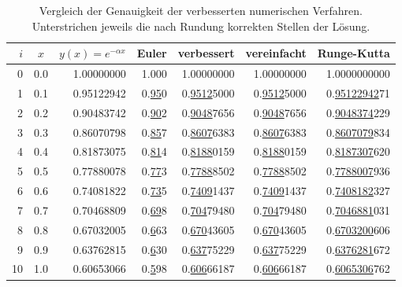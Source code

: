 \begin{table}
\centering
\begin{tabular}{|r|c|r|r|r|r|r|}
\hline
$i$& $x$ & $y(x)=e^{-\alpha x}$&Euler&verbessert&vereinfacht&Runge-Kutta\\
\hline
 0 & 0.0 & 1.00000000 & 1.000 & 1.00000000 & 1.00000000 & 1.0000000000 \\
 1 & 0.1 & 0.95122942 & 0.\underline{95}0 & 0.\underline{9512}5000 & 0.\underline{9512}5000 & 0.\underline{95122942}71 \\
 2 & 0.2 & 0.90483742 & 0.\underline{90}2 & 0.\underline{9048}7656 & 0.\underline{9048}7656 & 0.\underline{9048374}229 \\
 3 & 0.3 & 0.86070798 & 0.\underline{85}7 & 0.\underline{8607}6383 & 0.\underline{8607}6383 & 0.\underline{8607079}834 \\
 4 & 0.4 & 0.81873075 & 0.\underline{81}4 & 0.\underline{8188}0159 & 0.\underline{8188}0159 & 0.\underline{8187307}620 \\
 5 & 0.5 & 0.77880078 & 0.\underline{77}3 & 0.\underline{7788}8502 & 0.\underline{7788}8502 & 0.\underline{7788007}936 \\
 6 & 0.6 & 0.74081822 & 0.\underline{73}5 & 0.\underline{7409}1437 & 0.\underline{7409}1437 & 0.\underline{7408182}327 \\
 7 & 0.7 & 0.70468809 & 0.\underline{69}8 & 0.\underline{704}79480 & 0.\underline{704}79480 & 0.\underline{7046881}031 \\
 8 & 0.8 & 0.67032005 & 0.\underline{6}63 & 0.\underline{670}43605 & 0.\underline{670}43605 & 0.\underline{6703200}606 \\
 9 & 0.9 & 0.63762815 & 0.\underline{6}30 & 0.\underline{637}75229 & 0.\underline{637}75229 & 0.\underline{6376281}672 \\
10 & 1.0 & 0.60653066 & 0.\underline{5}98 & 0.\underline{606}66187 & 0.\underline{606}66187 & 0.\underline{6065306}762 \\
\hline
\end{tabular}
\caption{Vergleich der Genauigkeit der verbesserten numerischen Verfahren.
Unterstrichen jeweils die nach Rundung korrekten Stellen der Lösung.
\label{buch:ode:genauigkeit}}
\end{table}


